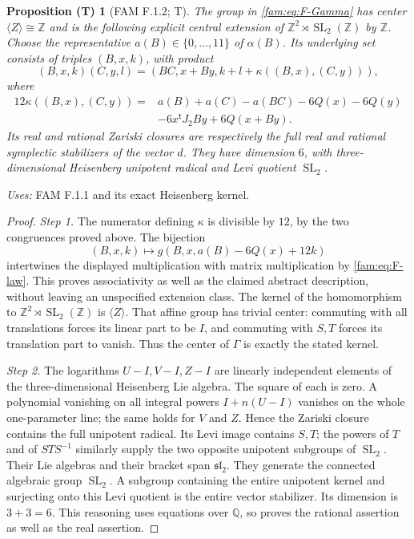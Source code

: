 \documentclass[11pt,a4paper]{article}
\theoremstyle{plain}
\newtheorem{proposition}[theorem]{Proposition (T)}
\theoremstyle{definition}
\begin{document}
\begin{proposition}[FAM F.1.2; T]\label{fam:F.1.2}
The group in \eqref{fam:eq:F-Gamma} has center
$\langle Z\rangle\cong\mathbb Z$ and is the following explicit central
extension of $\mathbb Z^2\rtimes\operatorname{SL}_2(\mathbb Z)$ by
$\mathbb Z$.  Choose the representative $a(B)\in\{0,\ldots,11\}$ of
$\alpha(B)$.  Its underlying set consists of triples $(B,x,k)$, with
product
\[
 (B,x,k)(C,y,l)=(BC,x+By,k+l+\kappa((B,x),(C,y))),
\]
where
\begin{align*}
12\kappa((B,x),(C,y))={}&a(B)+a(C)-a(BC)-6Q(x)-6Q(y)\\
 &-6x^{\mathsf t}J_2By+6Q(x+By).
\end{align*}
Its real and rational Zariski closures are respectively the full real
and rational symplectic stabilizers of the vector $d$.  They have
dimension $6$, with three-dimensional Heisenberg unipotent radical and
Levi quotient $\operatorname{SL}_2$.
\end{proposition}
\noindent\emph{Uses:} FAM F.1.1 and its exact Heisenberg kernel.\par

\begin{proof}
\par\noindent\textit{Step 1.} The numerator defining $\kappa$ is divisible by $12$, by the two
congruences proved above.  The bijection
\[
 (B,x,k)\longmapsto g(B,x,a(B)-6Q(x)+12k)
\]
intertwines the displayed multiplication with matrix multiplication by
\eqref{fam:eq:F-law}.  This proves associativity as well as the claimed abstract
description, without leaving an unspecified extension class.  The kernel
of the homomorphism to $\mathbb Z^2\rtimes\operatorname{SL}_2(\mathbb Z)$
is $\langle Z\rangle$.  That affine group has trivial center: commuting
with all translations forces its linear part to be $I$, and commuting
with $S,T$ forces its translation part to vanish.  Thus the center of
$\Gamma$ is exactly the stated kernel.

\par\noindent\textit{Step 2.} The logarithms $U-I,V-I,Z-I$ are linearly independent elements of the
three-dimensional Heisenberg Lie algebra.  The square of each is zero.
A polynomial vanishing on all integral powers $I+n(U-I)$ vanishes on
the whole one-parameter line; the same holds for $V$ and $Z$.  Hence the
Zariski closure contains the full unipotent radical.  Its Levi image
contains $S,T$; the powers of $T$ and of $STS^{-1}$ similarly supply the
two opposite unipotent subgroups of $\operatorname{SL}_2$.  Their Lie
algebras and their bracket span $\mathfrak{sl}_2$.  They generate the
connected algebraic group $\operatorname{SL}_2$.  A subgroup containing
the entire unipotent kernel and surjecting onto this Levi quotient is
the entire vector stabilizer.  Its dimension is $3+3=6$.  This reasoning
uses equations over $\mathbb Q$, so proves the rational assertion as
well as the real assertion.
\end{proof}
\end{document}
